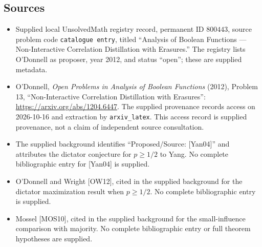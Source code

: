 \documentclass[11pt]{article}
\begin{document}
\subsection{Sources}
\begin{itemize}
\item Supplied local UnsolvedMath registry record, permanent ID \(800443\), source problem code \texttt{catalogue entry}, titled ``Analysis of Boolean Functions --- Non-Interactive Correlation Distillation with Erasures.'' The registry lists O'Donnell as proposer, year 2012, and status ``open''; these are supplied metadata.
\item O'Donnell, \emph{Open Problems in Analysis of Boolean Functions} (2012), Problem 13, ``Non-Interactive Correlation Distillation with Erasures'': \url{https://arxiv.org/abs/1204.6447}. The supplied provenance records access on 2026-10-16 and extraction by \texttt{arxiv\_latex}. This access record is supplied provenance, not a claim of independent source consultation.
\item The supplied background identifies ``Proposed/Source: [Yan04]'' and attributes the dictator conjecture for \(p\geq1/2\) to Yang. No complete bibliographic entry for [Yan04] is supplied.
\item O'Donnell and Wright [OW12], cited in the supplied background for the dictator maximization result when \(p\geq1/2\). No complete bibliographic entry is supplied.
\item Mossel [MOS10], cited in the supplied background for the small-influence comparison with majority. No complete bibliographic entry or full theorem hypotheses are supplied.
\end{itemize}
\end{document}
